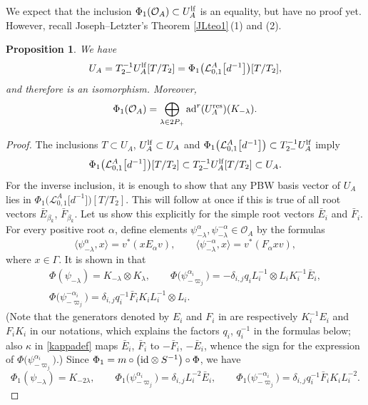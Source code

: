 \documentclass[pdftex]{sigma}
\numberwithin{equation}{section}
\newtheorem{prop}[teo]{Proposition}
\theoremstyle{definition}
\newcommand{\Ll}{{\mathcal L}}
\newcommand{\Oo}{{\mathcal O}}
\newcommand{\ra}{\rightarrow}
\begin{document}
We expect that the inclusion $\Phi_1(\Oo_A) \subset U_A^{\rm lf}$ is an equality, but have no proof yet. However, recall Joseph--Letzter's Theorem \ref{JLteo1}\,(1) and (2).
\begin{prop} \label{JLteo1overA} We have
\[
U_A = T_{2-}^{-1}U_A^{\rm lf}[T/T_{2}]=\Phi_1\big(\Ll_{0,1}^A\big[d^{-1}\big]\big)[T/T_{2}],\]
 and therefore \smash{$\Phi_1\colon \Ll_{0,1}^A\big[d^{-1}\big] \ra T_{2-}^{-1}U_A^{\rm lf}$} is an isomorphism. Moreover, \[\Phi_1(\Oo_A) = \bigoplus_{\lambda \in 2P_+} {\rm ad}^r(U_A^{\rm res})(K_{-\lambda}).\]
\end{prop}
\begin{proof} The inclusions $T\subset U_A$, $U_A^{\rm lf}\subset U_A$ and $\Phi_1\bigl(\Ll_{0,1}^A\big[d^{-1}\big]\bigr)\subset T_{2-}^{-1}U_A^{\rm lf}$ imply
\[\Phi_1\big(\Ll_{0,1}^A\big[d^{-1}\big]\big)[T/T_{2}]\subset T_{2-}^{-1}U_A^{\rm lf}[T/T_{2}]\subset U_A.\]
For the inverse inclusion, it is enough to show that any PBW basis vector of $U_A$ lies in $\Phi_1\big(\Ll_{0,1}^A\big[d^{-1}\big]\big)[T/T_{2}]$. This will follow at once if this is true of all root vectors $\bar{E}_{\beta_k}$, $\bar{F}_{\beta_k}$. Let us show this explicitly for the simple root vectors $\bar{E}_i$ and $\bar{F}_i$. For every positive root $\alpha$, define elements $\psi_{-\lambda}^{\alpha},\psi_{-\lambda}^{-\alpha}\in \Oo_A$ by the formulas
\[\langle \psi^{\alpha}_{-\lambda},x\rangle = v^*(xE_{\alpha} v),\qquad \langle \psi_{-\lambda}^{-\alpha},x\rangle = v^*(F_{\alpha} xv),\]
where $x\in \Gamma$. It is shown in \cite[Lemma~4.5]{DC-L} that
\begin{gather*}
\Phi(\psi_{-\lambda}) = K_{-\lambda} \otimes K_{\lambda},\qquad \Phi\big(\psi^{\alpha_i}_{-\varpi_j}\big) = - \delta_{i,j}q_i L_i^{-1} \otimes L_i K_i^{-1} \bar{E}_i, \\
 \Phi\big(\psi^{-\alpha_i}_{-\varpi_j}\big) =\delta_{i,j}q_i^{-1}\bar{F}_i K_i L_i^{-1}\otimes L_i .
\end{gather*}
\big(Note that the generators denoted by $E_i$ and $F_i$ in \cite{DC-L} are respectively $K_i^{-1}E_i$ and $F_iK_i$ in our notations, which explains the factors $q_i$, $q_i^{-1}$ in the formulas below; also $\kappa$ in \eqref{kappadef} maps $\bar{E}_i$, $\bar{F}_i$ to $-\bar{F}_i$, $-\bar{E}_i$, whence the sign for the expression of $\Phi\big(\psi^{\alpha_i}_{-\varpi_j}\big)$.\big) Since $\Phi_1 = m\circ \big({\rm id}\otimes S^{-1}\big)\circ \Phi$, we have
\begin{equation}
\label{formphi1K}
 \Phi_1(\psi_{-\lambda}) = K_{-2\lambda},\qquad \Phi_1\big(\psi^{\alpha_i}_{-\varpi_j}\big) =\delta_{i,j} L_i^{-2} \bar{E}_i ,\qquad \Phi_1\big(\psi^{-\alpha_i}_{-\varpi_j}\big) = \delta_{i,j}q_i^{-1}\bar{F}_i K_i L_i^{-2}.

\end{equation}
\end{proof}
\end{document}

